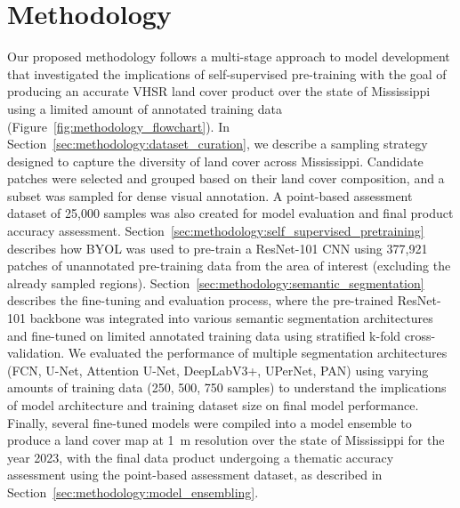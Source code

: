 \section{Methodology}\label{sec:methodology}

Our proposed methodology follows a multi-stage approach to model development that investigated the implications of self-supervised pre-training with the goal of producing an accurate VHSR land cover product over the state of Mississippi using a limited amount of annotated training data (Figure~\ref{fig:methodology_flowchart}).
In Section~\ref{sec:methodology:dataset_curation}, we describe a sampling strategy designed to capture the diversity of land cover across Mississippi.
Candidate patches were selected and grouped based on their land cover composition, and a subset was sampled for dense visual annotation. 
A point-based assessment dataset of 25,000 samples was also created for model evaluation and final product accuracy assessment.
Section~\ref{sec:methodology:self_supervised_pretraining} describes how BYOL was used to pre-train a ResNet-101 CNN using 377,921 patches of unannotated pre-training data from the area of interest (excluding the already sampled regions).
Section~\ref{sec:methodology:semantic_segmentation} describes the fine-tuning and evaluation process, where the pre-trained ResNet-101 backbone was integrated into various semantic segmentation architectures and fine-tuned on limited annotated training data using stratified k-fold cross-validation.
We evaluated the performance of multiple segmentation architectures (FCN, U-Net, Attention U-Net, DeepLabV3+, UPerNet, PAN) using varying amounts of training data (250, 500, 750 samples) to understand the implications of model architecture and training dataset size on final model performance.
Finally, several fine-tuned models were compiled into a model ensemble to produce a land cover map at \SI{1}{\meter} resolution over the state of Mississippi for the year 2023, with the final data product undergoing a thematic accuracy assessment using the point-based assessment dataset, as described in Section~\ref{sec:methodology:model_ensembling}.

